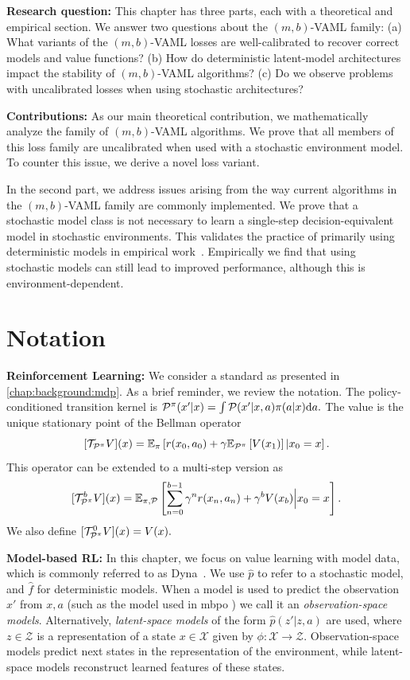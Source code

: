 \textbf{Research question:} This chapter has three parts, each with a theoretical and empirical section. We answer two questions about the $(m,b)$-VAML family: (a) What variants of the $(m,b)$-VAML losses are well-calibrated to recover correct models and value functions? (b) How do deterministic latent-model architectures impact the stability of $(m,b)$-VAML algorithms? (c) Do we observe problems with uncalibrated losses when using stochastic architectures?

\textbf{Contributions:} 
As our main theoretical contribution, we mathematically analyze the family of $(m,b)$-VAML algorithms.
We prove that all members of this loss family are uncalibrated when used with a stochastic environment model.
To counter this issue, we derive a novel loss variant.

In the second part, we address issues arising from the way current algorithms in the $(m,b)$-VAML family are commonly implemented.
We prove that a stochastic model class is not necessary to learn a single-step decision-equivalent model in stochastic environments.
This validates the practice of primarily using deterministic models in empirical work~\parencite{oh2017value,schrittwieser2020mastering,hansen2022temporal}.
Empirically we find that using stochastic models can still lead to improved performance, although this is environment-dependent.


\section{Notation}

\textbf{Reinforcement Learning:} We consider a standard as presented in \autoref{chap:background:mdp}.
As a brief reminder, we review the notation.
The policy-conditioned transition kernel is $\P^\pi(x'|x) = \int \P(x'|x,a) \pi(a|x) \mathrm{d} a.$
The value is the unique stationary point of the Bellman operator $$[\mathcal{T}_{\P^\pi} V](x) = \EEX{\pi}{r(x_0,a_0) + \gamma  \EEX{\P^\pi}{V(x_1)}|x_0=x}.$$
This operator can be extended to a multi-step version as $$[{\mathcal{T}}^b_{\P^\pi} V](x) = \EEX{\pi,\P}{\sum_{n=0}^{b-1} \gamma^n r(x_n,a_n) + \gamma^b {V(x_b)}\Big|x_0=x}.$$
We also define $[\mathcal{T}_{\P^\pi}^0 V](x) = V(x).$

\textbf{Model-based RL:} In this chapter, we focus on value learning with model data, which is commonly referred to as Dyna~\parencite{dyna}.
We use $\hat{p}$ to refer to a stochastic model, and $\hat{f}$ for deterministic models.
When a model is used to predict the observation $x'$ from $x,a$ (such as the model used in \ac{mbpo} \parencite{janner2019mbpo}) we call it an \emph{observation-space models}.
Alternatively, \emph{latent-space models} of the form $\hat{p}(z'|z, a)$ are used, where $z\in\mathcal{Z}$ is a representation of a state $x\in\mathcal{X}$ given by $\phi: \mathcal{X} \rightarrow \mathcal{Z}$.
Observation-space models predict next states in the representation of the environment, while latent-space models reconstruct learned features of these states.

